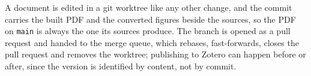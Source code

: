 A document is edited in a git worktree like any other change, and the commit
carries the built PDF and the converted figures beside the sources, so the PDF on
\texttt{main} is always the one its sources produce. The branch is opened as a
pull request and handed to the merge queue, which rebases, fast-forwards, closes
the pull request and removes the worktree; publishing to Zotero can happen before
or after, since the version is identified by content, not by commit.
